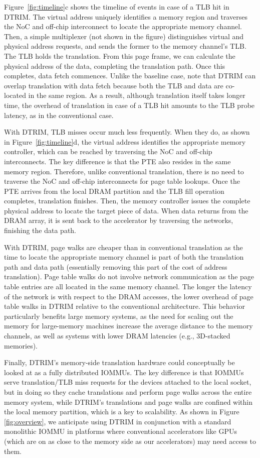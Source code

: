Figure~\ref{fig:timeline}c shows the timeline of events
in case of a TLB hit in DTRIM. The virtual address uniquely identifies a
memory region and traverses the NoC and off-chip interconnect to
locate the appropriate memory channel. Then, a simple multiplexer (not
shown in the figure) distinguishes virtual and physical address
requests, and sends the former to the memory channel's TLB. The TLB
holds the translation. From this page frame, we can calculate the
physical address of the data, completing the translation path. Once
this completes, data fetch commences. Unlike the baseline case, note
that DTRIM can overlap translation with data fetch because
both the TLB and data are co-located in the same region. As a result, although 
translation itself takes longer time, the overhead of translation in case of a TLB hit 
amounts to the TLB probe latency, as in the conventional case.

With DTRIM, TLB misses occur much less frequently. When they do, as
shown in Figure~\ref{fig:timeline}d, the virtual address
identifies the appropriate memory controller, which can be reached by
traversing the NoC and off-chip interconnects. The key difference is that
the PTE also resides in the same memory region. Therefore, unlike conventional translation, there is no need
to traverse the NoC and off-chip interconnects for page table
lookups. Once the PTE arrives from the local DRAM partition and the
TLB fill operation completes, translation finishes. Then, the memory
controller issues the complete physical address to locate the target
piece of data. When data returns from the DRAM array, it is sent back
to the accelerator by traversing the networks, finishing the data
path.

With DTRIM, page walks are cheaper than in conventional translation as
the time to locate the appropriate memory channel is part of both the
translation path and data path (essentially removing this part of the
cost of address translation). Page table walks do not involve network
communication as the page table entries are all located in the same
memory channel. The longer the latency of the network is with respect
to the DRAM accesses, the lower overhead of page table walks in DTRIM
relative to the conventional architecture. This behavior particularly
benefits large memory systems, as the need for scaling out the memory
for large-memory machines increase the average distance to the memory
channels, as well as systems with lower DRAM latencies (e.g.,
3D-stacked memories).

Finally, DTRIM's memory-side translation hardware could conceptually
be looked at as a fully distributed IOMMUs. The key difference is that
IOMMUs serve translation/TLB miss requests for the devices attached to
the local socket, but in doing so they cache translations and perform
page walks across the entire memory system, while DTRIM's translations
and page walks are confined within the local memory partition, which
is a key to scalability. As shown in Figure
\ref{fig:overview}, we anticipate using DTRIM in conjunction with a
standard monolithic IOMMU in platforms where conventional accelerators
like GPUs (which are on as close to the memory side as our
accelerators) may need access to them. 

